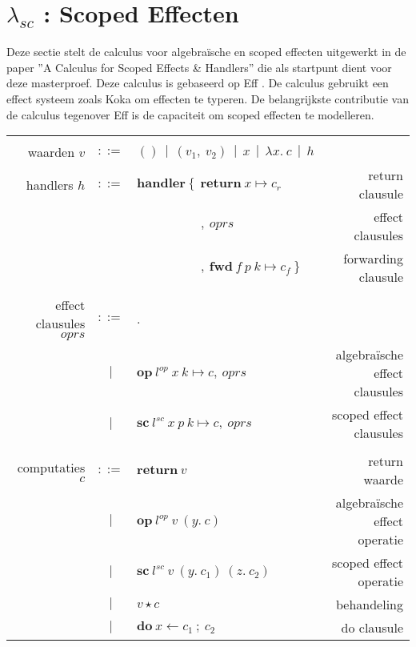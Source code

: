 \section{\texorpdfstring{$\lambda_{sc}$ :}{} Scoped Effecten} \label{hoofdstuk:startpuntScoped}
Deze sectie stelt de calculus voor algebraïsche en scoped effecten uitgewerkt in de paper ''A Calculus for Scoped Effects \& Handlers'' \cite{Bosman2022} die als startpunt dient voor deze masterproef. Deze calculus is gebaseerd op Eff \cite{Bauer2015}. De calculus gebruikt een effect systeem zoals Koka \cite{Leijen2017} om effecten te typeren. De belangrijkste contributie van de calculus tegenover Eff is de capaciteit om scoped effecten te modelleren.
\begin{table}
    \centering
    \begin{tabular}{|r c l r|}
    \hline
         & & & \\ 
         waarden $v$ & $::=$ & $() \: \: | \: \: (v_{1}, \: v_{2} ) \: \: | \: \: x \: \: | \: \: \lambda x . \: c \: \: | \: \: h$ & \\
         handlers $h$ & $::=$ & $\textbf{handler} \: \{ \: \: \textbf{return} \: x \mapsto c_{r}$ & return clausule\\
         & & $\qquad \qquad \quad , \: oprs$ & effect  clausules \\
         & & $\qquad \qquad \quad , \: \textbf{fwd} \: f \: p \: k \mapsto c_{f} \: \} $ & forwarding clausule \\
         & & & \\
          effect clausules $oprs$ & $::=$ & . & \\ 
          & $|$ & $\textbf{op} \ l^{op} \ x \ k \mapsto c, \ oprs$ & algebraïsche effect clausules \\
           & $|$ & $\textbf{sc} \ l^{sc} \ x \ p \ k \mapsto c, \ oprs$ & scoped effect clausules \\
        & & & \\
         computaties $c$ & $::=$ & $\textbf{return} \ v$ & return waarde \\
          & $|$ & $\textbf{op} \ l^{op} \ v \ (y. \ c)$ & algebraïsche effect operatie \\
          & $|$ & $\textbf{sc} \ l^{sc} \ v \ (y. \ c_{1}) \ (z. \ c_{2})$ & scoped effect operatie \\
          & $|$ & $v \star c$ & behandeling \\
          & $|$ & $\textbf{do} \: x \leftarrow c_{1}\:; \: c_{2}$ & do clausule \\

\end{tabular}
\end{table}
